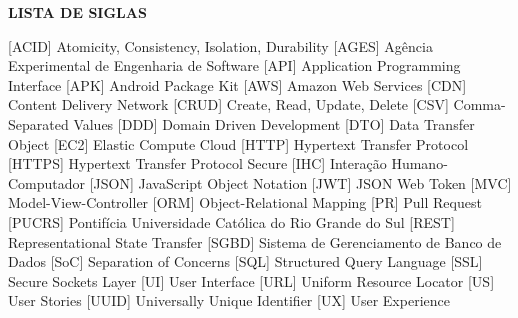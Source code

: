 
\begin{center}
  \uppercase{\bfseries lista de siglas}\\[3em]
\end{center}

\begin{acronym}[XXXXXXXX]
   [ACID] {Atomicity, Consistency, Isolation, Durability}
   [AGES] {Agência Experimental de Engenharia de Software}
   [API] {Application Programming Interface}
   [APK] {Android Package Kit}
   [AWS] {Amazon Web Services}
   [CDN] {Content Delivery Network}
   [CRUD] {Create, Read, Update, Delete}
   [CSV] {Comma-Separated Values}
   [DDD] {Domain Driven Development}
   [DTO] {Data Transfer Object}
   [EC2] {Elastic Compute Cloud}
   [HTTP] {Hypertext Transfer Protocol}
   [HTTPS] {Hypertext Transfer Protocol Secure}
   [IHC] {Interação Humano-Computador}
   [JSON] {JavaScript Object Notation}
   [JWT] {JSON Web Token}
   [MVC] {Model-View-Controller}
   [ORM] {Object-Relational Mapping}
   [PR] {Pull Request}
   [PUCRS] {Pontifícia Universidade Católica do Rio Grande do Sul}
   [REST] {Representational State Transfer}
   [SGBD] {Sistema de Gerenciamento de Banco de Dados}
   [SoC] {Separation of Concerns}
   [SQL] {Structured Query Language}
   [SSL] {Secure Sockets Layer}
   [UI] {User Interface}
   [URL] {Uniform Resource Locator}
   [US] {User Stories}
   [UUID] {Universally Unique Identifier}
   [UX] {User Experience}
\end{acronym}